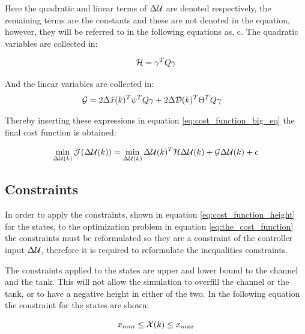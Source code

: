 Here the quadratic and linear terms of $\Delta \CMcal{U}$ are denoted respectively, the remaining terms are the constants and these are not denoted in the equation, however, they will be referred to in the following equations as, c. The quadratic variables are collected in: 

\begin{equation}\label{eq:quadratic_h_matrix}
	\CMcal{H} = \gamma^T Q\gamma 
\end{equation}

And the linear variables are collected in:
\begin{equation}
	\begin{aligned}
	\CMcal{G} &= 2 \Delta \hat{x}(k)^T\psi^T Q \gamma+2 \Delta \CMcal{D}(k)^T\Theta^T Q \gamma 
	\end{aligned}
\end{equation}

Thereby inserting these expressions in equation \ref{eq:cost_function_big_eq} the final cost function is obtained:

\begin{equation}\label{eq:the_cost_function}
	\min_{\Delta \CMcal{U}(k)} \CMcal{J}(\Delta \CMcal{U}(k)) =\min_{\Delta \CMcal{U}(k)} \Delta \CMcal{U}(k)^T\CMcal{H}\Delta \CMcal{U}(k)+\CMcal{G}\Delta \CMcal{U}(k)+c
\end{equation}

\subsection{Constraints}\label{subse:constraints}

In order to apply the constraints, shown in equation \ref{eq:cost_function_height} for the states, to the optimization problem in equation \ref{eq:the_cost_function} the constraints must be reformulated so they are a constraint of the controller input $\Delta\CMcal{U}$, therefore it is required to reformulate the inequalities constraints. 

The constraints applied to the states are upper and lower bound to the channel and the tank. This will not allow the simulation to overfill the channel or the tank, or to have a negative height in either of the two. In the following equation the constraint for the states are shown:  


\begin{equation}
    x_{min} \leq \CMcal{X}(k) \leq x_{max}
\end{equation}

